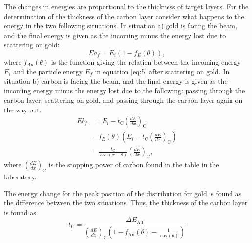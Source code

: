The changes in energies are proportional to the thickness of target layers. For the determination of the thickness of the carbon layer consider what happens to the energy in the two following situations. In situation a) gold is facing the beam, and the final energy is given as the incoming minus the energy lost due to scattering on gold:
\begin{equation*}
Ea_f = E_i (1-f_E(\theta)), 
\end{equation*}
where $f_{Au}(\theta)$ is the function giving the relation between the incoming energy $E_i$ and the particle energy $E_f$ in equation \cref{eq:5} after scattering on gold. 
In situation b) carbon is facing the beam, and the final energy is given as the incoming energy minus the energy lost due to the following: passing through the carbon layer, scattering on gold, and passing through the carbon layer again on the way out. 
\begin{align*}
Eb_f &= E_i - t_\mathrm{C} \left(\frac{dE}{dx}\right)_\mathrm{C} 
\\ &- f_E(\theta) \left(E_i - t_\mathrm{C} \left(\frac{dE}{dx}\right)_\mathrm{C} \right) \\ &- \frac{t_\mathrm{C}}{\cos(\pi-\theta)} \left(\frac{dE}{dx}\right)_\mathrm{C}, 
\end{align*}
where $\left(\frac{dE}{dx}\right)_\mathrm{C}$ is the stopping power of carbon found in the table in the laboratory.

The energy change for the peak position of the distribution for gold is found as the difference between the two situations. Thus, the thickness of the carbon layer is found as 
\begin{equation}
t_\mathrm{C} = \frac{\Delta E_{\mathrm{Au}}}{\left(\frac{dE}{dx}\right)_\mathrm{C} \left(1 - f_\mathrm{Au}(\theta) - \frac{1}{\cos(\theta)} \right)}
\end{equation}






